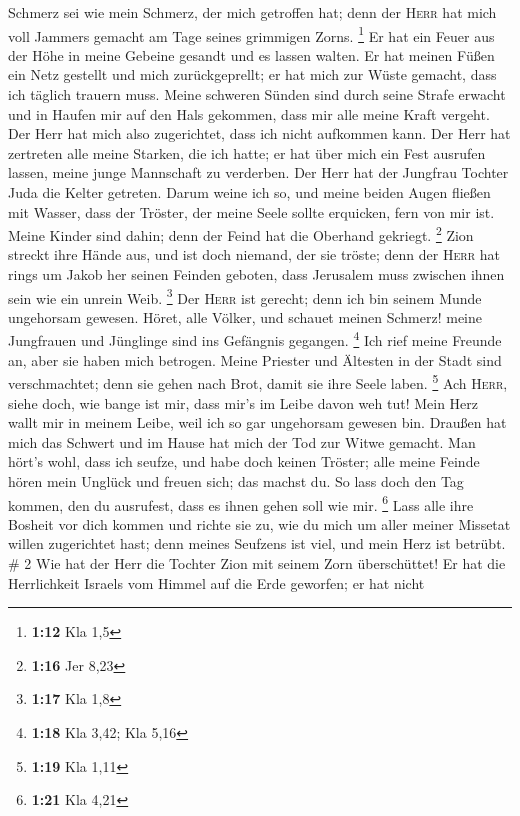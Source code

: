Schmerz sei wie mein Schmerz, der mich getroffen hat; denn der
\textsc{Herr} hat mich voll Jammers gemacht am Tage seines grimmigen
Zorns. \footnote{\textbf{1:12} Kla 1,5}  Er hat ein Feuer
aus der Höhe in meine Gebeine gesandt und es lassen walten. Er hat
meinen Füßen ein Netz gestellt und mich zurückgeprellt; er hat mich zur
Wüste gemacht, dass ich täglich trauern muss.  Meine
schweren Sünden sind durch seine Strafe erwacht und in Haufen mir auf
den Hals gekommen, dass mir alle meine Kraft vergeht. Der Herr hat mich
also zugerichtet, dass ich nicht aufkommen kann.  Der
Herr hat zertreten alle meine Starken, die ich hatte; er hat über mich
ein Fest ausrufen lassen, meine junge Mannschaft zu verderben. Der Herr
hat der Jungfrau Tochter Juda die Kelter getreten.  Darum
weine ich so, und meine beiden Augen fließen mit Wasser, dass der
Tröster, der meine Seele sollte erquicken, fern von mir ist. Meine
Kinder sind dahin; denn der Feind hat die Oberhand gekriegt. \footnote{\textbf{1:16}
  Jer 8,23}  Zion streckt ihre Hände aus, und ist doch
niemand, der sie tröste; denn der \textsc{Herr} hat rings um Jakob her
seinen Feinden geboten, dass Jerusalem muss zwischen ihnen sein wie ein
unrein Weib. \footnote{\textbf{1:17} Kla 1,8}  Der
\textsc{Herr} ist gerecht; denn ich bin seinem Munde ungehorsam gewesen.
Höret, alle Völker, und schauet meinen Schmerz! meine Jungfrauen und
Jünglinge sind ins Gefängnis gegangen. \footnote{\textbf{1:18} Kla 3,42;
  Kla 5,16}  Ich rief meine Freunde an, aber sie haben
mich betrogen. Meine Priester und Ältesten in der Stadt sind
verschmachtet; denn sie gehen nach Brot, damit sie ihre Seele laben.
\footnote{\textbf{1:19} Kla 1,11}  Ach \textsc{Herr},
siehe doch, wie bange ist mir, dass mir's im Leibe davon weh tut! Mein
Herz wallt mir in meinem Leibe, weil ich so gar ungehorsam gewesen bin.
Draußen hat mich das Schwert und im Hause hat mich der Tod zur Witwe
gemacht.  Man hört's wohl, dass ich seufze, und habe doch
keinen Tröster; alle meine Feinde hören mein Unglück und freuen sich;
das machst du. So lass doch den Tag kommen, den du ausrufest, dass es
ihnen gehen soll wie mir. \footnote{\textbf{1:21} Kla 4,21}
 Lass alle ihre Bosheit vor dich kommen und richte sie
zu, wie du mich um aller meiner Missetat willen zugerichtet hast; denn
meines Seufzens ist viel, und mein Herz ist betrübt. \# 2 
Wie hat der Herr die Tochter Zion mit seinem Zorn überschüttet! Er hat
die Herrlichkeit Israels vom Himmel auf die Erde geworfen; er hat nicht
